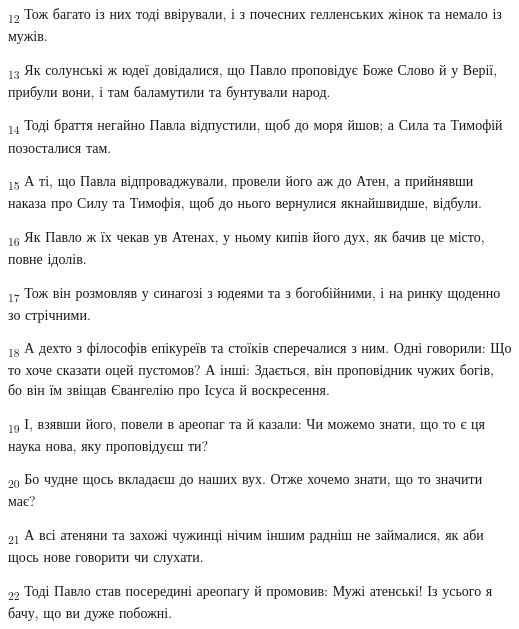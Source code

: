 \begin{tcolorbox}
\textsubscript{12} Тож багато із них тоді ввірували, і з почесних гелленських жінок та немало із мужів.
\end{tcolorbox}
\begin{tcolorbox}
\textsubscript{13} Як солунські ж юдеї довідалися, що Павло проповідує Боже Слово й у Верії, прибули вони, і там баламутили та бунтували народ.
\end{tcolorbox}
\begin{tcolorbox}
\textsubscript{14} Тоді браття негайно Павла відпустили, щоб до моря йшов; а Сила та Тимофій позосталися там.
\end{tcolorbox}
\begin{tcolorbox}
\textsubscript{15} А ті, що Павла відпроваджували, провели його аж до Атен, а прийнявши наказа про Силу та Тимофія, щоб до нього вернулися якнайшвидше, відбули.
\end{tcolorbox}
\begin{tcolorbox}
\textsubscript{16} Як Павло ж їх чекав ув Атенах, у ньому кипів його дух, як бачив це місто, повне ідолів.
\end{tcolorbox}
\begin{tcolorbox}
\textsubscript{17} Тож він розмовляв у синагозі з юдеями та з богобійними, і на ринку щоденно зо стрічними.
\end{tcolorbox}
\begin{tcolorbox}
\textsubscript{18} А дехто з філософів епікуреїв та стоїків сперечалися з ним. Одні говорили: Що то хоче сказати оцей пустомов? А інші: Здається, він проповідник чужих богів, бо він їм звіщав Євангелію про Ісуса й воскресення.
\end{tcolorbox}
\begin{tcolorbox}
\textsubscript{19} І, взявши його, повели в ареопаг та й казали: Чи можемо знати, що то є ця наука нова, яку проповідуєш ти?
\end{tcolorbox}
\begin{tcolorbox}
\textsubscript{20} Бо чудне щось вкладаєш до наших вух. Отже хочемо знати, що то значити має?
\end{tcolorbox}
\begin{tcolorbox}
\textsubscript{21} А всі атеняни та захожі чужинці нічим іншим радніш не займалися, як аби щось нове говорити чи слухати.
\end{tcolorbox}
\begin{tcolorbox}
\textsubscript{22} Тоді Павло став посередині ареопагу й промовив: Мужі атенські! Із усього я бачу, що ви дуже побожні.
\end{tcolorbox}
